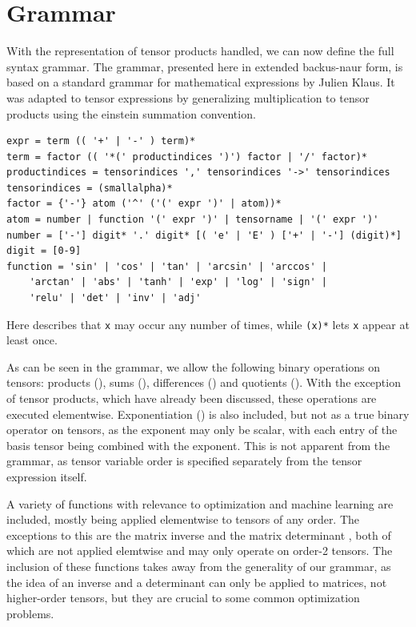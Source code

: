 \documentclass[12pt, a4paper]{report}
\begin{document}
\section{Grammar}
With the representation of tensor products handled, we can now define the full syntax grammar.
The grammar, presented here in extended backus-naur form, is based on a standard grammar for mathematical expressions by Julien Klaus.
It was adapted to tensor expressions by generalizing multiplication to tensor products using the einstein summation convention.
\begin{verbatim}
expr = term (( '+' | '-' ) term)*
term = factor (( '*(' productindices ')') factor | '/' factor)*
productindices = tensorindices ',' tensorindices '->' tensorindices
tensorindices = (smallalpha)*
factor = {'-'} atom ('^' ('(' expr ')' | atom))*
atom = number | function '(' expr ')' | tensorname | '(' expr ')'
number = ['-'] digit* '.' digit* [( 'e' | 'E' ) ['+' | '-'] (digit)*]
digit = [0-9]
function = 'sin' | 'cos' | 'tan' | 'arcsin' | 'arccos' | 
    'arctan' | 'abs' | 'tanh' | 'exp' | 'log' | 'sign' | 
    'relu' | 'det' | 'inv' | 'adj'
\end{verbatim}
Here \texttt{} describes that \texttt{x} may occur any number of times, while \texttt{(x)*} lets \texttt{x} appear at least once.

As can be seen in the grammar, we allow the following binary operations on tensors: products (\codeword{*(,->)}), sums (\codeword{+}), differences (\codeword{-}) and quotients (\codeword{/}).
With the exception of tensor products, which have already been discussed, these operations are executed elementwise.
Exponentiation (\codeword{^}) is also included, but not as a true binary operator on tensors, as the exponent may only be scalar, with each entry of the basis tensor being combined with the exponent.
This is not apparent from the grammar, as tensor variable order is specified separately from the tensor expression itself.

A variety of functions with relevance to optimization and machine learning are included, mostly being applied elementwise to tensors of any order.
The exceptions to this are the matrix inverse  and the matrix determinant , both of which are not applied elemtwise and may only operate on order-2 tensors.
The inclusion of these functions takes away from the generality of our grammar, as the idea of an inverse and a determinant can only be applied to matrices, not higher-order tensors, but they are crucial to some common optimization problems.
\end{document}
